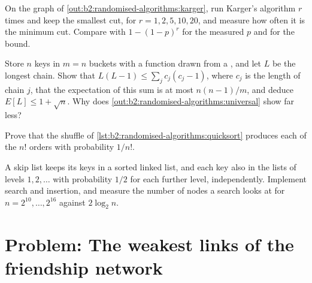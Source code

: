\begin{exercise}[$\star\star$]\label{exo:b2:randomised-algorithms:9}
On the graph of \cref{out:b2:randomised-algorithms:karger}, run Karger's algorithm $r$ times and keep the smallest cut,
for $r = 1, 2, 5, 10, 20$, and measure how often it is the minimum cut. Compare with $1 - (1 - p)^r$ for the measured $p$
and for the bound.
\end{exercise}

\begin{exercise}[$\star\star\star$]\label{exo:b2:randomised-algorithms:10}
Store $n$ keys in $m = n$ buckets with a function drawn from a , and let $L$ be the longest chain. Show
that $L(L - 1) \leq \sum_j c_j(c_j - 1)$, where $c_j$ is the length of chain $j$, that the expectation of this sum is at
most $n(n - 1)/m$, and deduce $E[L] \leq 1 + \sqrt{n}$. Why does \cref{out:b2:randomised-algorithms:universal} show far
less?
\end{exercise}

\begin{exercise}[$\star\star\star$]\label{exo:b2:randomised-algorithms:11}
Prove that the shuffle of \cref{lst:b2:randomised-algorithms:quicksort} produces each of the $n!$ orders with
probability $1/n!$.
\end{exercise}

\begin{exercise}[$\star\star\star$]\label{exo:b2:randomised-algorithms:12}
A skip list keeps its keys in a sorted linked list, and each key also in the lists of levels $1, 2, \dots$ with
probability $1/2$ for each further level, independently. Implement search and insertion, and measure the number of nodes
a search looks at for $n = 2^{10}, \dots, 2^{16}$ against $2 \log_2 n$.
\end{exercise}

\section{Problem: The weakest links of the friendship network}\label{sec:b2:randomised-algorithms:problem}


